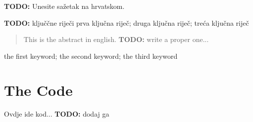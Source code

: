 \documentclass[zavrsnirad]{fer}
\begin{document}
\begin{sazetak}
  \textbf{TODO:} Unesite sažetak na hrvatskom.
  \blindtext
\end{sazetak}

\begin{kljucnerijeci}
  \textbf{TODO:} ključčne riječi
  prva ključna riječ; druga ključna riječ; treća ključna riječ
\end{kljucnerijeci}


\begin{abstract}
  This is the abstract in english. \textbf{TODO:} write a proper one...
  \blindtext
\end{abstract}

\begin{keywords}
  the first keyword; the second keyword; the third keyword
\end{keywords}



\backmatter

\chapter{The Code}

Ovdje ide kod... \textbf{TODO:} dodaj ga
\end{document}
